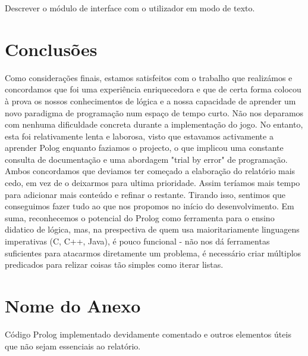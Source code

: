 \documentclass[a4paper]{article}
\begin{document}
Descrever o módulo de interface com o utilizador em modo de texto.


\section{Conclusões}
Como considerações finais, estamos satisfeitos com o trabalho que realizámos e concordamos que foi uma experiência enriquecedora e que de certa forma colocou à prova os nossos conhecimentos de lógica e a nossa capacidade de aprender um novo paradigma de programação num espaço de tempo curto.
Não nos deparamos com nenhuma dificuldade concreta durante a implementação do jogo. No entanto, esta foi relativamente lenta e laborosa, visto que estavamos activamente a aprender Polog enquanto faziamos o projecto, o que implicou uma constante consulta de documentação e uma abordagem "trial by error" de programação.
Ambos concordamos que deviamos ter começado a elaboração do relatório mais cedo, em vez de o deixarmos para ultima prioridade. Assim teríamos mais tempo para adicionar mais conteúdo e refinar o restante. Tirando isso, sentimos que conseguimos fazer tudo ao que nos propomos no início do desenvolvimento.
Em suma, reconhecemos o potencial do Prolog como ferramenta para o ensino didatico de lógica, mas, na prespectiva de quem usa maioritariamente linguagens imperativas (C, C++, Java), é pouco funcional - não nos dá ferramentas suficientes para atacarmos diretamente um problema, é necessário criar múltiplos predicados para relizar coisas tão simples como iterar listas.



\clearpage
{}
\renewcommand\refname{Bibliografia}



\newpage
\appendix
\section{Nome do Anexo}
Código Prolog implementado devidamente comentado e outros elementos úteis que não sejam essenciais ao relatório.
\end{document}
